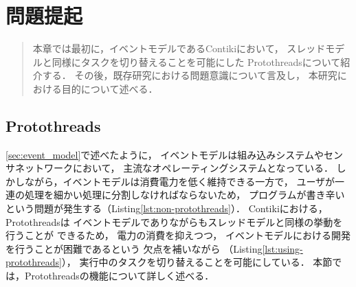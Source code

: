 \chapter{問題提起}
\begin{large}
\begin{quote}
本章では最初に，イベントモデルであるContikiにおいて，
スレッドモデルと同様にタスクを切り替えることを可能にした
Protothreadsについて紹介する．
その後，既存研究における問題意識について言及し，
本研究における目的について述べる．


\end{quote}
\end{large}
\clearpage

\section{Protothreads}\label{sec:protothreads}
\ref{sec:event_model}で述べたように，
イベントモデルは組み込みシステムやセンサネットワークにおいて，
主流なオペレーティングシステムとなっている．
しかしながら，イベントモデルは消費電力を低く維持できる一方で，
ユーザが一連の処理を細かい処理に分割しなければならないため，
プログラムが書き辛いという問題が発生する（Listing\ref{lst:non-protothreads}）．
Contiki\cite{Dunkels:2004:CLF:1032658.1034117}における，
Protothreads\cite{Dunkels:2006:PSE:1182807.1182811}は
イベントモデルでありながらもスレッドモデルと同様の挙動を行うことが
できるため，
電力の消費を抑えつつ，
イベントモデルにおける開発を行うことが困難であるという
欠点を補いながら
（Listing\ref{lst:using-protothreads}），
実行中のタスクを切り替えることを可能にしている．
本節では，Protothreadsの機能について詳しく述べる．



